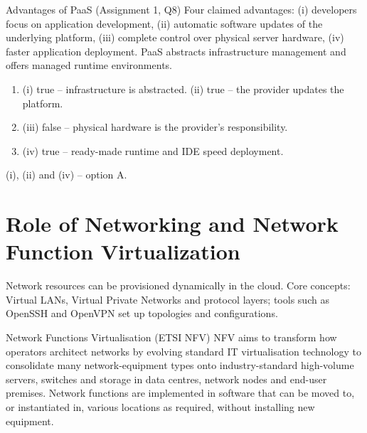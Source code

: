 \begin{solved}{Advantages of PaaS (Assignment 1, Q8)}
\Given Four claimed advantages: (i) developers focus on application development, (ii) automatic software
updates of the underlying platform, (iii) complete control over physical server hardware, (iv) faster
application deployment.
\Formula PaaS abstracts infrastructure management and offers managed runtime environments.
\Steps
\begin{enumerate}[leftmargin=*]
  \item (i) true -- infrastructure is abstracted. (ii) true -- the provider updates the platform.
  \item (iii) false -- physical hardware is the provider's responsibility.
  \item (iv) true -- ready-made runtime and IDE speed deployment.
\end{enumerate}
\Answer (i), (ii) and (iv) -- option A.
\end{solved}

\section{Role of Networking and Network Function Virtualization}
Network resources can be provisioned dynamically in the cloud. Core concepts: Virtual LANs, Virtual
Private Networks and protocol layers; tools such as OpenSSH and OpenVPN set up topologies and
configurations.

\begin{defbox}{Network Functions Virtualisation (ETSI NFV)}
NFV aims to transform how operators architect networks by evolving standard IT virtualisation technology to
consolidate many network-equipment types onto industry-standard high-volume servers, switches and storage in
data centres, network nodes and end-user premises. Network functions are implemented in software that can be
moved to, or instantiated in, various locations as required, without installing new equipment.
\end{defbox}

